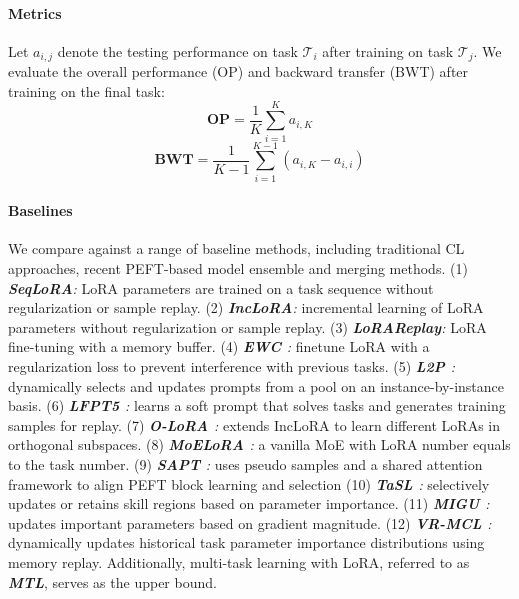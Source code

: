 \paragraph{Metrics}
Let $a_{i,j}$ denote the testing performance on task $\mathcal{T}_i$ after training on task $\mathcal{T}_j$.
We evaluate the overall performance (OP) \cite{chaudhry2018riemannian} and backward transfer (BWT) \cite{lopez2017gradient} after training on the final task:
\begin{equation}
    \mathbf{OP} =\frac{1}{K} \sum_{i=1}^{K} a_{i, K}
\end{equation}
\begin{equation}
    \mathbf{BWT} = \frac{1}{K-1} \sum\limits_{i=1}^{K-1} (a_{i, K}-a_{i, i})
\end{equation}


\paragraph{Baselines}
We compare {\ouralg} against a range of baseline methods, including traditional CL approaches, recent PEFT-based model ensemble and merging methods. 
(1) \textit{\textbf{SeqLoRA}:} LoRA parameters are trained on a task sequence without regularization or sample replay.
(2) \textit{\textbf{IncLoRA}:} incremental learning of LoRA parameters without regularization or sample replay.
(3) \textit{\textbf{LoRAReplay}:} LoRA fine-tuning with a memory buffer.
(4) \textit{\textbf{EWC \cite{kirkpatrick2017overcoming}}:} finetune LoRA with a regularization loss to prevent interference with previous tasks.
(5) \textit{\textbf{L2P \cite{wang2022learning}}:} dynamically selects and updates prompts from a pool on an instance-by-instance basis.
(6) \textit{\textbf{LFPT5 \cite{qin2021lfpt5}}:} learns a soft prompt that solves tasks and generates training samples for replay.
(7) \textit{\textbf{O-LoRA \cite{wang2023orthogonal}}:} extends IncLoRA to
learn different LoRAs in orthogonal subspaces.
(8) \textit{\textbf{MoELoRA \cite{luo2024moelora}}:} a vanilla MoE with LoRA number equals to the task number.
(9) \textit{\textbf{SAPT \cite{zhao2024sapt}}:} uses pseudo samples and a shared attention framework to align PEFT block learning and selection
(10) \textit{\textbf{TaSL \cite{feng2024tasl}}:} selectively updates or retains skill regions based on parameter importance.
(11) \textit{\textbf{MIGU \cite{du2024unlocking}}:} updates important parameters based on gradient magnitude.
(12) \textit{\textbf{VR-MCL \cite{wu2024meta}}:} dynamically updates historical task parameter importance distributions using memory replay.
Additionally, multi-task learning with LoRA, referred to as \textit{\textbf{MTL}}, serves as the upper bound.









